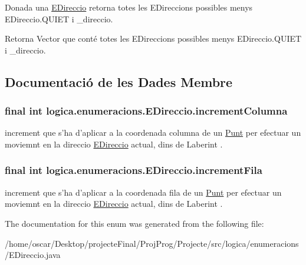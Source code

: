 Donada una \hyperlink{enumlogica_1_1enumeracions_1_1_e_direccio}{E\+Direccio} retorna totes les E\+Direccions possibles menys E\+Direccio.\+Q\+U\+I\+E\+T i \+\_\+direccio. 

\begin{DoxyReturn}{Retorna}
Vector que conté totes les E\+Direccions possibles menys E\+Direccio.\+Q\+U\+I\+E\+T i \+\_\+direccio. 
\end{DoxyReturn}


\subsection{Documentació de les Dades Membre}
\hypertarget{enumlogica_1_1enumeracions_1_1_e_direccio_a55188904e0a2d50611f032d0fed63fac}{
\subsubsection[{increment\+Columna}]{\setlength{\rightskip}{0pt plus 5cm}final int logica.\+enumeracions.\+E\+Direccio.\+increment\+Columna\hspace{0.3cm}{\ttfamily [private]}}}\label{enumlogica_1_1enumeracions_1_1_e_direccio_a55188904e0a2d50611f032d0fed63fac}
increment que s'ha d'aplicar a la coordenada columna de un \hyperlink{classlogica_1_1_punt}{Punt} per efectuar un moviemnt en la direccio \hyperlink{enumlogica_1_1enumeracions_1_1_e_direccio}{E\+Direccio} actual, dins de Laberint . \hypertarget{enumlogica_1_1enumeracions_1_1_e_direccio_a7f54d2a6315924892ed78da3635a6358}{
\subsubsection[{increment\+Fila}]{\setlength{\rightskip}{0pt plus 5cm}final int logica.\+enumeracions.\+E\+Direccio.\+increment\+Fila\hspace{0.3cm}{\ttfamily [private]}}}\label{enumlogica_1_1enumeracions_1_1_e_direccio_a7f54d2a6315924892ed78da3635a6358}
increment que s'ha d'aplicar a la coordenada fila de un \hyperlink{classlogica_1_1_punt}{Punt} per efectuar un moviemnt en la direccio \hyperlink{enumlogica_1_1enumeracions_1_1_e_direccio}{E\+Direccio} actual, dins de Laberint . 

The documentation for this enum was generated from the following file\+:\begin{DoxyCompactItemize}
\item 
/home/oscar/\+Desktop/projecte\+Final/\+Proj\+Prog/\+Projecte/src/logica/enumeracions/E\+Direccio.\+java\end{DoxyCompactItemize}
